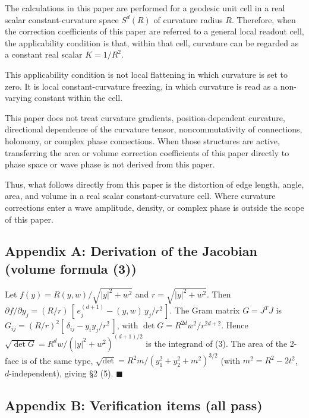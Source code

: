 \documentclass[
]{ltjsarticle}
\begin{document}
The calculations in this paper are performed for a geodesic unit cell in
a real scalar constant-curvature space \(S^d(R)\) of curvature radius
\(R\). Therefore, when the correction coefficients of this paper are
referred to a general local readout cell, the applicability condition is
that, within that cell, curvature can be regarded as a constant real
scalar \(K=1/R^2\).

This applicability condition is not local flattening in which curvature
is set to zero. It is local constant-curvature freezing, in which
curvature is read as a non-varying constant within the cell.

This paper does not treat curvature gradients, position-dependent
curvature, directional dependence of the curvature tensor,
noncommutativity of connections, holonomy, or complex phase connections.
When those structures are active, transferring the area or volume
correction coefficients of this paper directly to phase space or wave
phase is not derived from this paper.

Thus, what follows directly from this paper is the distortion of edge
length, angle, area, and volume in a real scalar constant-curvature
cell. Where curvature corrections enter a wave amplitude, density, or
complex phase is outside the scope of this paper.

\subsection{Appendix A: Derivation of the Jacobian (volume formula
(3))}\label{appendix-a-derivation-of-the-jacobian-volume-formula-3}

Let \(f(y)=R(y,w)/\sqrt{|y|^2+w^2}\) and \(r=\sqrt{|y|^2+w^2}\). Then
\(\partial f/\partial y_j=(R/r)\,[\,e_j^{(d+1)} - (y,w)\,y_j/r^2\,]\).
The Gram matrix \(G=J^{T}J\) is
\(G_{ij}=(R/r)^2[\,\delta_{ij} - y_i y_j/r^2\,]\), with
\(\det G=R^{2d}w^2/r^{2d+2}\). Hence
\(\sqrt{\det G}=R^{d}w/(|y|^2+w^2)^{(d+1)/2}\) is the integrand of (3).
The area of the 2-face is of the same type,
\(\sqrt{\det}=R^2 m/(y_1^2+y_2^2+m^2)^{3/2}\) (with \(m^2=R^2-2t^2\),
\(d\)-independent), giving §2 (5). \(\blacksquare\)

\subsection{Appendix B: Verification items (all
pass)}\label{appendix-b-verification-items-all-pass}
\end{document}
